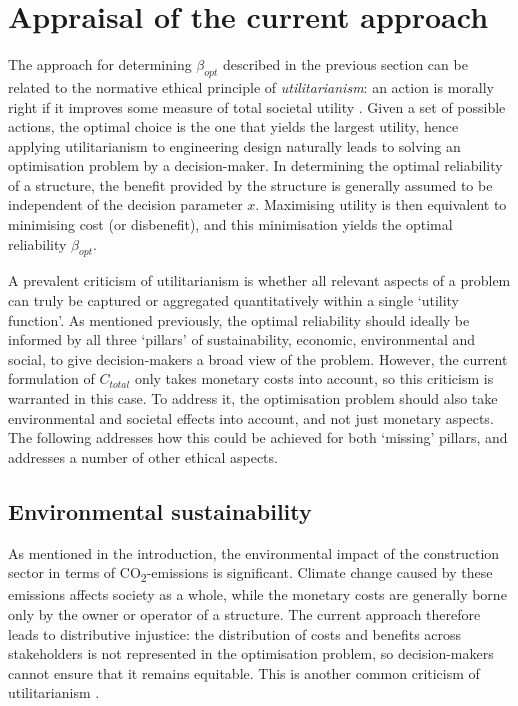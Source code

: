 \newpage
\section{Appraisal of the current approach}
\label{sec:appraisal}

The approach for determining $\beta_{opt}$ described in the previous section can be related to the normative ethical principle of \emph{utilitarianism}: an action is morally right if it improves some measure of total societal utility \citep{Mill1863Utilitarianism, vandePoel2011EthicsEngineering}.
Given a set of possible actions, the optimal choice is the one that yields the largest utility, hence applying utilitarianism to engineering design naturally leads to solving an optimisation problem by a decision-maker.
In determining the optimal reliability of a structure, the benefit provided by the structure is generally assumed to be independent of the decision parameter $x$. 
Maximising utility is then equivalent to minimising cost (or disbenefit), and this minimisation yields the optimal reliability $\beta_{opt}$.

A prevalent criticism of utilitarianism is whether all relevant aspects of a problem can truly be captured or aggregated quantitatively within a single `utility function'\citep{vandePoel2011EthicsEngineering}. 
As mentioned previously, the optimal reliability should ideally be informed by all three `pillars' of sustainability, economic, environmental and social, to give decision-makers a broad view of the problem.
However, the current formulation of $C_{total}$ only takes monetary costs into account, so this criticism is warranted in this case.
To address it, the optimisation problem should also take environmental and societal effects into account, and not just monetary aspects.
The following addresses how this could be achieved for both `missing' pillars, and addresses a number of other ethical aspects.


\subsection{Environmental sustainability}

As mentioned in the introduction, the environmental impact of the construction sector in terms of CO\textsubscript{2}-emissions is significant.
Climate change caused by these emissions affects society as a whole, while the monetary costs are generally borne only by the owner or operator of a structure.
The current approach therefore leads to distributive injustice: the distribution of costs and benefits across stakeholders is not represented in the optimisation problem, so decision-makers cannot ensure that it remains equitable.
This is another common criticism of utilitarianism \cite{vandePoel2011EthicsEngineering}.


